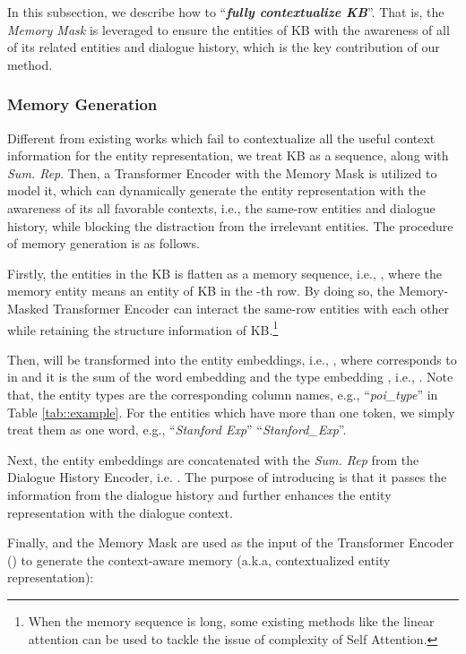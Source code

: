 \documentclass[11pt]{article}
\begin{document}
In this subsection, we describe how to ``\textbf{\textit{fully contextualize KB}}”. That is, the  \textit{Memory Mask} is leveraged to ensure the entities of KB with the awareness of all of its related entities and dialogue history, which is the key contribution of our method.

\subsubsection{Memory Generation}
\label{sssec::rep_gen}

Different from existing works which fail to contextualize all the useful context information for the entity representation, we treat KB as a sequence, along with \textit{Sum. Rep}. Then, a Transformer Encoder with the Memory Mask is utilized to model it, which can dynamically generate the entity representation with the awareness of its all favorable contexts, i.e., the same-row entities and dialogue history, while blocking the distraction from the irrelevant entities. The procedure of memory generation is as follows.

Firstly, the entities in the KB  is flatten as a memory sequence, i.e., , where the memory entity  means an entity of KB in the -th row. By doing so, the Memory-Masked Transformer Encoder can interact the same-row entities with each other while retaining the structure information of KB.\footnote{When the memory sequence is long, some existing methods like the linear attention \cite{kitaev2020reformer} can be used to tackle the issue of  complexity of Self Attention.}

Then,  will be transformed into the entity embeddings, i.e., , where  corresponds to  in  and it is the sum of the word embedding  and the type embedding , i.e., . Note that, the entity types are the corresponding column names, e.g., ``\textit{poi\_type}'' in Table \ref{tab::example}. For the entities which have more than one token, we simply treat them as one word, e.g., ``\textit{Stanford Exp}''  ``\textit{Stanford\_Exp}''.

Next, the entity embeddings are concatenated with the \textit{Sum. Rep} from the Dialogue History Encoder, i.e. . The purpose of introducing  is that it passes the information from the dialogue history and further enhances the entity representation with the dialogue context.


Finally,  and the Memory Mask  are used as the input of the Transformer Encoder () to generate the context-aware memory (a.k.a, contextualized entity representation):
\end{document}
